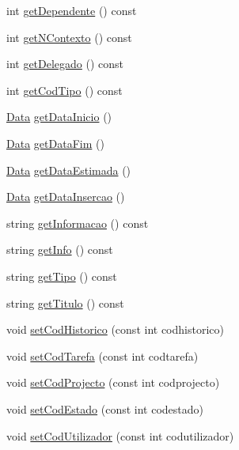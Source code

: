\begin{DoxyCompactItemize}
\item 
int \hyperlink{class_historico_tarefa_a49eea9268424a2daf58223d25d3246c6}{get\-Dependente} () const 
\item 
int \hyperlink{class_historico_tarefa_a8a9aee3ca5861fec3676813b19dd28dc}{get\-N\-Contexto} () const 
\item 
int \hyperlink{class_historico_tarefa_a5317cac1c72ca73fcffdc38d750796e9}{get\-Delegado} () const 
\item 
int \hyperlink{class_historico_tarefa_a8907de68c20d1e0c530d910bc583379c}{get\-Cod\-Tipo} () const 
\item 
\hyperlink{class_data}{Data} \hyperlink{class_historico_tarefa_a5bd25abc6a99d812c2afdd503f1544a7}{get\-Data\-Inicio} ()
\item 
\hyperlink{class_data}{Data} \hyperlink{class_historico_tarefa_a916b0f460f014896a76607c7de367fc0}{get\-Data\-Fim} ()
\item 
\hyperlink{class_data}{Data} \hyperlink{class_historico_tarefa_abbf04fa2f96a4bae5de4b048dae315f8}{get\-Data\-Estimada} ()
\item 
\hyperlink{class_data}{Data} \hyperlink{class_historico_tarefa_a0d7cce52338508dc57fc163c780069f7}{get\-Data\-Insercao} ()
\item 
string \hyperlink{class_historico_tarefa_a52d86f160f3933af4f471630b91ee9f3}{get\-Informacao} () const 
\item 
string \hyperlink{class_historico_tarefa_a4bd081780056cc1eefb9afe68f6fc6ca}{get\-Info} () const 
\item 
string \hyperlink{class_historico_tarefa_a4d7f3fe2dbce7a1ea9bef7d811774217}{get\-Tipo} () const 
\item 
string \hyperlink{class_historico_tarefa_a7fa67730997a0e48fee327655ae0f43b}{get\-Titulo} () const 
\item 
void \hyperlink{class_historico_tarefa_a7099976e3b5d85d16369074eb9e557e9}{set\-Cod\-Historico} (const int codhistorico)
\item 
void \hyperlink{class_historico_tarefa_a84c7cd785784c9f9c83bd958a8f867ce}{set\-Cod\-Tarefa} (const int codtarefa)
\item 
void \hyperlink{class_historico_tarefa_a5c9b1577d9c0197e55f8c4b9db45e7e4}{set\-Cod\-Projecto} (const int codprojecto)
\item 
void \hyperlink{class_historico_tarefa_a2f9021aa2d8f1cfdcb60a45cf0a0b189}{set\-Cod\-Estado} (const int codestado)
\item 
void \hyperlink{class_historico_tarefa_a65fa596d7d122a8863cad03c7615d809}{set\-Cod\-Utilizador} (const int codutilizador)

\end{DoxyCompactItemize}
